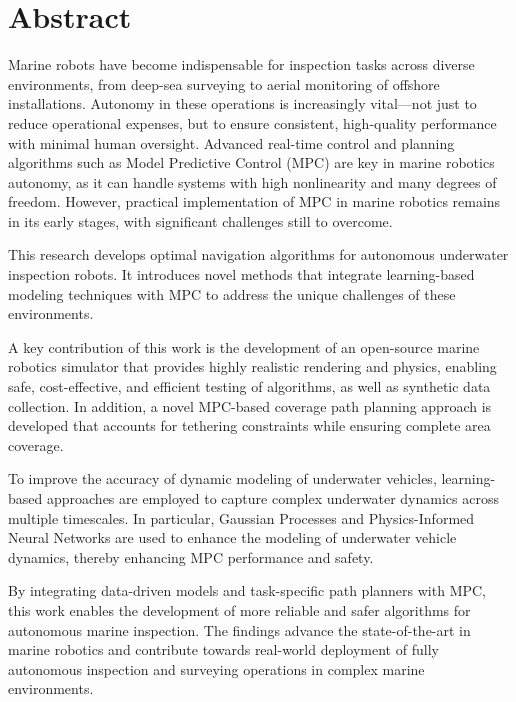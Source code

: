 \chapter*{Abstract}

Marine robots have become indispensable for inspection tasks across diverse environments, from deep-sea surveying to aerial monitoring of offshore installations. Autonomy in these operations is increasingly vital—not just to reduce operational expenses, but to ensure consistent, high-quality performance with minimal human oversight. Advanced real-time control and planning algorithms such as Model Predictive Control (MPC) are key in marine robotics autonomy, as it can handle systems with high nonlinearity and many degrees of freedom. However, practical implementation of MPC in marine robotics remains in its early stages, with significant challenges still to overcome. 

This research develops optimal navigation algorithms for autonomous underwater inspection robots. It introduces novel methods that integrate learning-based modeling techniques with MPC to address the unique challenges of these environments.

A key contribution of this work is the development of an open-source marine robotics simulator that provides highly realistic rendering and physics, enabling safe, cost-effective, and efficient testing of algorithms, as well as synthetic data collection. In addition, a novel MPC-based coverage path planning approach is developed that accounts for tethering constraints while ensuring complete area coverage.

To improve the accuracy of dynamic modeling of underwater vehicles, learning-based approaches are employed to capture complex underwater dynamics across multiple timescales. In particular, Gaussian Processes and Physics-Informed Neural Networks are used to enhance the modeling of underwater vehicle dynamics, thereby enhancing MPC performance and safety.

By integrating data-driven models and task-specific path planners with MPC, this work enables the development of more reliable and safer algorithms for autonomous marine inspection. The findings advance the state-of-the-art in marine robotics and contribute towards real-world deployment of fully autonomous inspection and surveying operations in complex marine environments.

\newpage

